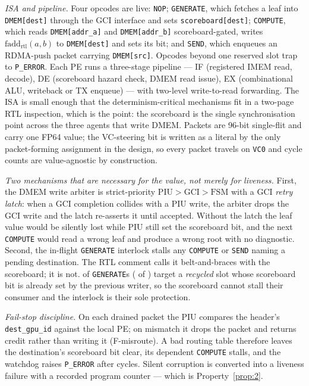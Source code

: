 \documentclass[journal,10pt]{IEEEtran}
\theoremstyle{plain}
\theoremstyle{definition}
\theoremstyle{remark}
\newcommand{\fadd}{\ensuremath{\mathrm{fadd}_{\mathrm{rtl}}}}
\newcommand{\sv}[1]{\texttt{#1}}
\begin{document}
\emph{ISA and pipeline.} Four opcodes are live: \texttt{NOP};
\texttt{GENERATE}, which fetches a leaf into \texttt{DMEM[dest]} through the
GCI interface and sets \texttt{scoreboard[dest]}; \texttt{COMPUTE}, which
reads \texttt{DMEM[addr\_a]} and \texttt{DMEM[addr\_b]} scoreboard-gated,
writes $\fadd(a,b)$ to \texttt{DMEM[dest]} and sets its bit; and
\texttt{SEND}, which enqueues an RDMA-push packet carrying
\texttt{DMEM[src]}. Opcodes beyond one reserved slot trap to
\texttt{P\_ERROR}. Each PE runs a three-stage pipeline --- \textsf{IF}
(registered IMEM read, decode), \textsf{DE} (scoreboard hazard check, DMEM
read issue), \textsf{EX} (combinational ALU, writeback or TX enqueue) --- with
two-level write-to-read forwarding. The ISA is small enough that the
determinism-critical mechanisms fit in a two-page RTL inspection, which is the
point: the scoreboard is the single synchronisation point across the three
agents that write DMEM. Packets are 96-bit single-flit and carry one FP64
value; the VC-steering bit is written as a literal \VcBitLiteral{} by the only
packet-forming assignment in the design, so every packet travels on \sv{VC0}
and cycle counts are value-agnostic by construction.

\emph{Two mechanisms that are necessary for the value, not merely for
liveness.} First, the DMEM write arbiter is strict-priority
$\mathrm{PIU} > \mathrm{GCI} > \mathrm{FSM}$ with a GCI \emph{retry latch}:
when a GCI completion collides with a PIU write, the arbiter drops the GCI
write and the latch re-asserts it until accepted. Without the latch the leaf
value would be silently lost while PIU still set the scoreboard bit, and the
next \texttt{COMPUTE} would read a wrong leaf and produce a wrong root with no
diagnostic. Second, the in-flight \texttt{GENERATE} interlock stalls any
\texttt{COMPUTE} or \texttt{SEND} naming a pending destination. The RTL
comment calls it belt-and-braces with the scoreboard; it is not.
\GenRecycledPct{} of \texttt{GENERATE}s (\GenRecycled{} of \GenTotal{}) target
a \emph{recycled} slot whose scoreboard bit is already set by the previous
writer, so the scoreboard cannot stall their consumer and the interlock is
their sole protection.

\emph{Fail-stop discipline.} On each drained packet the PIU compares the
header's \sv{dest\_gpu\_id} against the local PE; on mismatch it drops the
packet and returns credit rather than writing it (\textsf{F-misroute}). A bad
routing table therefore leaves the destination's scoreboard bit clear, its
dependent \texttt{COMPUTE} stalls, and the watchdog raises \texttt{P\_ERROR}
after \WatchdogMax{} cycles. Silent corruption is converted into a liveness
failure with a recorded program counter --- which is Property~\ref{prop:2}.
\end{document}
